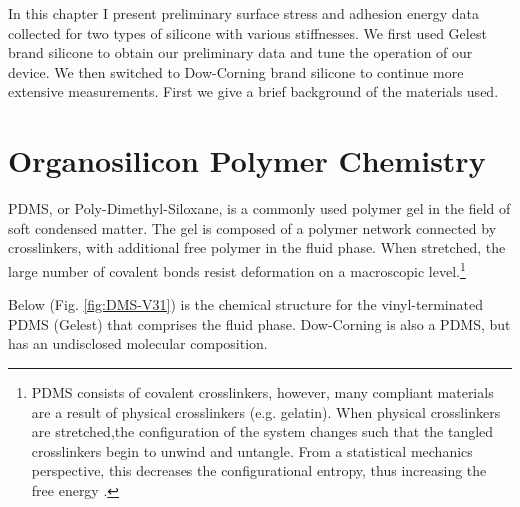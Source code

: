 In this chapter I present preliminary surface stress and adhesion energy data collected for two types of silicone with various stiffnesses. We first used Gelest brand silicone to obtain our preliminary data and tune the operation of our device. We then switched to Dow-Corning brand silicone to continue more extensive measurements. First we give a brief background of the materials used. 


\section{Organosilicon Polymer Chemistry}
\label{section:polychem}
PDMS, or Poly-Dimethyl-Siloxane, is a commonly used polymer gel in the field of soft condensed matter. The gel is composed of a polymer network connected by crosslinkers, with additional free polymer in the fluid phase. When stretched, the large number of covalent bonds resist deformation on a macroscopic level.\footnote{PDMS consists of covalent crosslinkers, however, many compliant materials are a result of physical crosslinkers (e.g. gelatin). When physical crosslinkers are stretched,the configuration of the system changes such that the tangled crosslinkers begin to unwind and untangle. From a statistical mechanics perspective, this decreases the configurational entropy, thus increasing the free energy \cite{Andreotti2020}.} 


Below (Fig. \ref{fig:DMS-V31}) is the chemical structure for the vinyl-terminated PDMS (Gelest) that comprises the fluid phase. Dow-Corning is also a PDMS, but has an undisclosed molecular composition.
\setatomsep{20pt}

\newcommand\setpolymerdelim[2]{\def\delimleft{#1}\def\delimright{#2}}
\def\makebraces(#1,#2)#3#4#5{%
	\edef\delimhalfdim{\the\dimexpr(#1+#2)/2}%
	\edef\delimvshift{\the\dimexpr(#1-#2)/2}%
	\chemmove{
		\node[at=(#4),yshift=(\delimvshift)]
		{$
			\left\delimleft
			\vrule height\delimhalfdim depth\delimhalfdim width0pt
			\right.
			$};
		\node[at=(#5),yshift=(\delimvshift)]
		{$
			\left.
			\vrule height\delimhalfdim depth\delimhalfdim width0pt
			\right\delimright_{\rlap{#3}}
			$};
	}%
}

